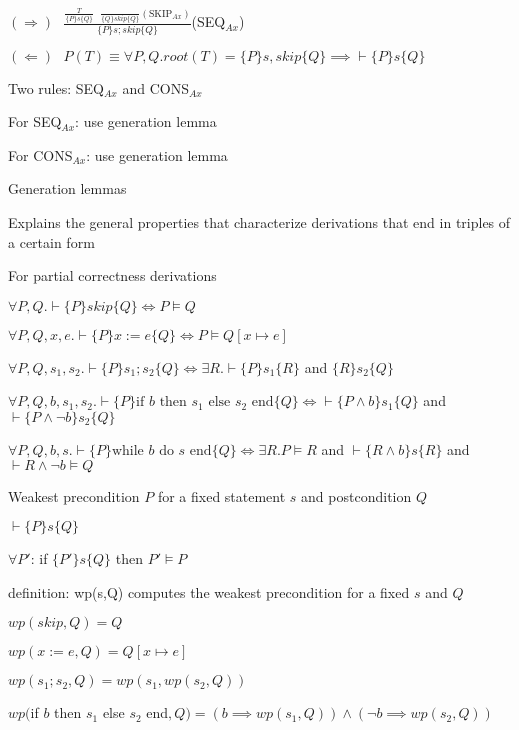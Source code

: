			\item $(\Rightarrow) \ \ \ \frac{\frac{T}{\{P\}s\{Q\}}\ \ \ \frac{}{\{Q\}skip\{Q\}}(\text{SKIP}_{Ax})}{\{P\}s;skip\{Q\}}$(SEQ$_{Ax}$)
			\item $(\Leftarrow) \ \ \ P(T) \equiv \forall P,Q. root(T)=\{P\}s, skip\{Q\} \implies \vdash \{P\}s\{Q\}$
			\item Two rules: SEQ$_{Ax}$ and CONS$_{Ax}$
			\item For SEQ$_{Ax}$: use generation lemma
			\item For CONS$_{Ax}$: use generation lemma
		\enumend
		\item Generation lemmas
		\enumstart
			\item Explains the general properties that characterize derivations that end in triples of a certain form
			\item For partial correctness derivations
			\enumstart
				\item $\forall P,Q. \vdash\{P\}skip\{Q\} \Leftrightarrow P \vDash Q$
				\item $\forall P,Q,x,e. \vdash\{P\}x := e\{Q\} \Leftrightarrow P \vDash Q[x \mapsto e]$
				\item $\forall P,Q,s_1,s_2. \vdash\{P\}s_1;s_2\{Q\} \Leftrightarrow \exists R. \vdash \{P\}s_1\{R\}$ and $\{R\}s_2\{Q\}$
				\item $\forall P,Q,b,s_1,s_2. \vdash\{P\}\text{if }b\text{ then }s_1\text{ else }s_2\text{ end}\{Q\} \Leftrightarrow \vdash \{P \land b\}s_1\{Q\}$ and $\vdash \{P \land \lnot b\}s_2\{Q\}$
				\item $\forall P,Q,b,s. \vdash \{P\}\text{while }b\text{ do }s\text{ end}\{Q\} \Leftrightarrow \exists R. P \vDash R$ and $\vdash \{R \land b\}s\{R\}$ and $\vdash R \land \lnot b \vDash Q$
			\enumend
		\enumend
		\item Weakest precondition $P$ for a fixed statement $s$ and postcondition $Q$
		\enumstart
			\item $\vdash\{P\}s\{Q\}$
			\item $\forall P'$: if $\{P'\}s\{Q\}$ then $P' \vDash P$
			\item definition: wp(s,Q) computes the weakest precondition for a fixed $s$ and $Q$
			\enumstart
				\item $wp(skip, Q) = Q$
				\item $wp(x := e, Q) = Q[x \mapsto e]$
				\item $wp(s_1;s_2,Q) = wp(s_1, wp(s_2,Q))$
				\item $wp($if $b$ then $s_1$ else $s_2$ end$,Q) = (b \implies wp(s_1,Q)) \land (\lnot b \implies wp(s_2, Q))$

